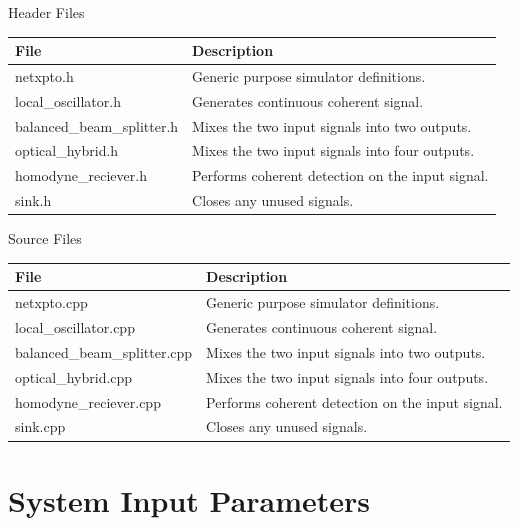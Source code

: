 \documentclass[a4paper]{article}
\begin{document}
Header Files
\begin{table}[H]
\centering
\begin{tabulary}{1.0\textwidth}{|L|L|}
\hline
\textbf{File}              & \textbf{Description} 				            \\ \hline
netxpto.h                  & Generic purpose simulator definitions.	        \\ \hline
local\_oscillator.h        & Generates continuous coherent signal.            \\ \hline
balanced\_beam\_splitter.h & Mixes the two input signals into two outputs.    \\ \hline
optical\_hybrid.h          & Mixes the two input signals into four outputs.   \\ \hline
homodyne\_reciever.h       & Performs coherent detection on the input signal. \\ \hline
sink.h                     & Closes any unused signals.                       \\ \hline
\end{tabulary}
\end{table}
%
Source Files
\begin{table}[H]
\centering
\begin{tabulary}{1.0\textwidth}{|L|L|}
\hline
\textbf{File}                & \textbf{Description} 					          \\ \hline
netxpto.cpp                  & Generic purpose simulator definitions.	          \\ \hline
local\_oscillator.cpp        & Generates continuous coherent signal.            \\ \hline
balanced\_beam\_splitter.cpp & Mixes the two input signals into two outputs.    \\ \hline
optical\_hybrid.cpp          & Mixes the two input signals into four outputs.   \\ \hline
homodyne\_reciever.cpp       & Performs coherent detection on the input signal. \\ \hline
sink.cpp                     & Closes any unused signals.                       \\ \hline
\end{tabulary}
\end{table}


\section{System Input Parameters}
\end{document}
